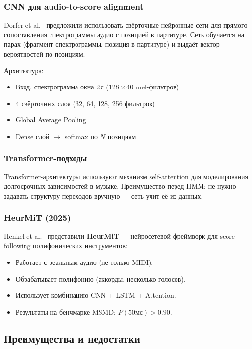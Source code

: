 \documentclass[a4paper,11pt]{article}
\begin{document}
\subsubsection{CNN для audio-to-score alignment}

Dorfer et al.~\cite{dorfer2018} предложили использовать свёрточные нейронные
сети для прямого сопоставления спектрограммы аудио с позицией в партитуре.
Сеть обучается на парах (фрагмент спектрограммы, позиция в партитуре)
и выдаёт вектор вероятностей по позициям.

Архитектура:
\begin{itemize}[leftmargin=2em]
  \item Вход: спектрограмма окна 2\,с ($128 \times 40$ mel-фильтров)
  \item 4 свёрточных слоя (32, 64, 128, 256 фильтров)
  \item Global Average Pooling
  \item Dense слой $\to$ softmax по $N$ позициям
\end{itemize}

\subsubsection{Transformer-подходы}

Transformer-архитектуры используют механизм self-attention для моделирования
долгосрочных зависимостей в музыке. Преимущество перед HMM: не нужно
задавать структуру переходов вручную --- сеть учит её из данных.

\subsubsection{HeurMiT (2025)}

Henkel et al.~\cite{henkel2025} представили \textbf{HeurMiT} --- нейросетевой
фреймворк для score-following полифонических инструментов:
\begin{itemize}[leftmargin=2em]
  \item Работает с реальным аудио (не только MIDI).
  \item Обрабатывает полифонию (аккорды, несколько голосов).
  \item Использует комбинацию CNN + LSTM + Attention.
  \item Результаты на бенчмарке MSMD: $P(50\text{мс}) > 0.90$.
\end{itemize}

\subsection{Преимущества и недостатки}
\end{document}
